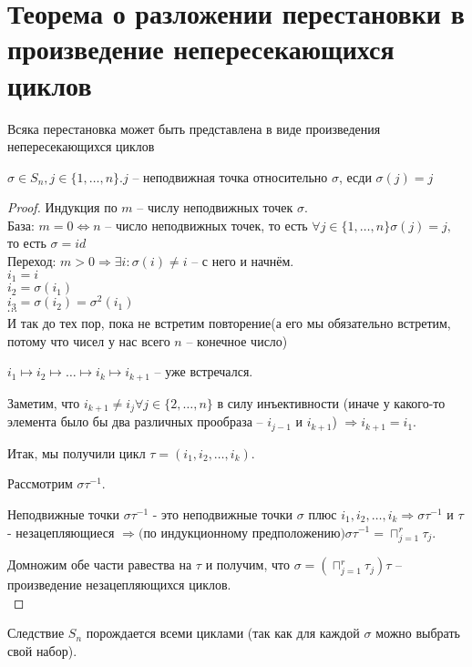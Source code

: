 \section{Теорема о разложении перестановки в произведение непересекающихся циклов}

\begin{theorem}{Всяка перестановка может быть представлена в виде произведения непересекающихся циклов}
\begin{Def}
	$\sigma \in S_n, j \in \{1, \dotsc, n\}. j$ -- неподвижная точка относительно $\sigma$, есди $\sigma(j) = j$
\end{Def}
\end{theorem}
\begin{proof}
	Индукция по $m$ -- числу неподвижных точек $\sigma$.\\
База: $m = 0 \Leftrightarrow n $ -- число неподвижных точек, то есть $\forall j \in \{1, \dotsc, n\} \sigma(j) = j, $ то есть $\sigma = id$\\
Переход: $m > 0 \Rightarrow \exists i: \sigma(i) \ne i$ -- с него и начнём.\\
$i_1 = i$\\
$i_2 = \sigma(i_1)$\\
$i_3 = \sigma(i_2) = \sigma^2(i_1)$\\
$\dotsb$\\
И так до тех пор, пока не встретим повторение(а его мы обязательно встретим, потому что чисел у нас всего $n$ -- конечное число)

$i_1 \mapsto i_2 \mapsto \dotsc \mapsto i_k \mapsto i_{k+1}$ -- уже встречался. 

Заметим, что $i_{k+1} \ne i_j \forall j \in \{2, \dotsc, n\}$ в силу инъективности \sigma (иначе у какого-то элемента было бы два различных прообраза -- $i_{j-1}$ и $i_{k+1}$) $\Rightarrow i_{k+1} = i_1$.  

Итак, мы получили цикл $\tau = (i_1, i_2, \dotsc, i_k)$. 

Рассмотрим $\sigma\tau^{-1}$. 

Неподвижные точки $\sigma\tau^{-1}$ - это неподвижные точки $\sigma $ плюс $i_1, i_2, \dotsc, i_k \Rightarrow \sigma\tau^{-1}$ и $\tau$ - незацепляющиеся $\Rightarrow($по индукционному предположению$) \sigma\tau^{-1} = \sqcap_{j = 1}^r \tau_j$. 

Домножим обе части равества на $\tau$ и получим, что $\sigma = (\sqcap_{j = 1}^r \tau_j)\tau$ -- произведение незацепляющихся циклов.\\
\end{proof}
\begin{theorem}{Следствие}
$S_n$ порождается всеми циклами (так как для каждой $\sigma$ можно выбрать свой набор).
\end{theorem}

